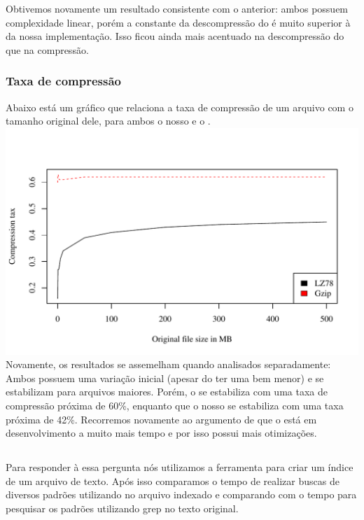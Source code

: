 Obtivemos novamente um resultado consistente com o anterior: ambos possuem
complexidade linear, porém a constante da descompressão do \gzip é muito
superior à da nossa implementação. Isso ficou ainda mais acentuado na
descompressão do que na compressão.

\subsubsection{Taxa de compressão}

Abaixo está um gráfico que relaciona a taxa de compressão de um arquivo com o
tamanho original dele, para ambos o nosso \lz e o \gzip.
\\
\includegraphics[scale=0.74]{../experiments/R/pdf/comp_tax}
\\

Novamente, os resultados se assemelham quando analisados separadamente:
Ambos possuem uma variação inicial (apesar do \gzip ter uma bem menor) e se
estabilizam para arquivos maiores. Porém, o \gzip se estabiliza com uma taxa de
compressão próxima de 60\%, enquanto que o nosso \lz se estabiliza com uma taxa
próxima de 42\%. Recorremos novamente ao argumento de que o \gzip está em
desenvolvimento a muito mais tempo e por isso possui mais otimizações.

\subsection{\rqtwo}
Para responder à essa pergunta nós utilizamos a ferramenta \ipmt para criar um
índice de um arquivo de texto. Após isso comparamos o tempo de realizar buscas
de diversos padrões utilizando \ipmt no arquivo indexado e comparando com o
tempo para pesquisar os padrões utilizando grep no texto original.


